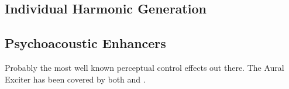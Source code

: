 	\subsection{Individual Harmonic Generation}
	\label{sec:Excitation-Individuals}

	\subsection{Psychoacoustic Enhancers}
	\label{sec:Excitation-Enhancers}
		\note
		{
			Probably the most well known perceptual control effects out there. The Aural Exciter has been covered by both \citet{chalupper2000aural} and \citet{shekar2013modeling}.
		}
